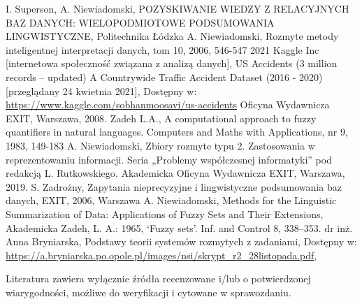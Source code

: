 \documentclass{classrep}
\begin{document}
\begin{thebibliography}{99}
 I. Superson, A. Niewiadomski, POZYSKIWANIE WIEDZY Z RELACYJNYCH BAZ DANYCH: WIELOPODMIOTOWE PODSUMOWANIA LINGWISTYCZNE, Politechnika Łódzka
 A. Niewiadomski, Rozmyte metody inteligentnej interpretacji danych, tom 10, 2006, 546-547
 2021 Kaggle Inc [internetowa społeczność związana z analizą danych], US Accidents (3 million records -- updated)
A Countrywide Traffic Accident Dataset (2016 - 2020) [przeglądany 24 kwietnia 2021], Dostępny w: \url{https://www.kaggle.com/sobhanmoosavi/us-accidents}
Oficyna Wydawnicza EXIT, Warszawa, 2008.
 Zadeh L.A., A computational approach to fuzzy quantifiers in natural languages. Computers and Maths with Applications, nr 9, 1983, 149-183
 A. Niewiadomski, Zbiory rozmyte typu 2. Zastosowania w reprezentowaniu informacji. Seria „Problemy współczesnej informatyki” pod redakcją L. Rutkowskiego. Akademicka Oficyna Wydawnicza EXIT, Warszawa, 2019.
 S. Zadrożny, Zapytania nieprecyzyjne i lingwistyczne podsumowania baz danych, EXIT, 2006, Warszawa
 A. Niewiadomski, Methods for the Linguistic Summarization of Data: Applications of Fuzzy Sets and Their Extensions, Akademicka
 Zadeh, L. A.: 1965, ‘Fuzzy sets’. Inf. and Control 8, 338–353.
 dr inż. Anna Bryniarska, Podstawy teorii systemów rozmytych z zadaniami, Dostępny w: \url{https://a.bryniarska.po.opole.pl/images/nsi/skrypt_r2_28listopada.pdf},
\end{thebibliography}

Literatura zawiera wyłącznie źródła recenzowane i/lub o potwierdzonej wiarygodności,
możliwe do weryfikacji i cytowane w sprawozdaniu.
\end{document}
